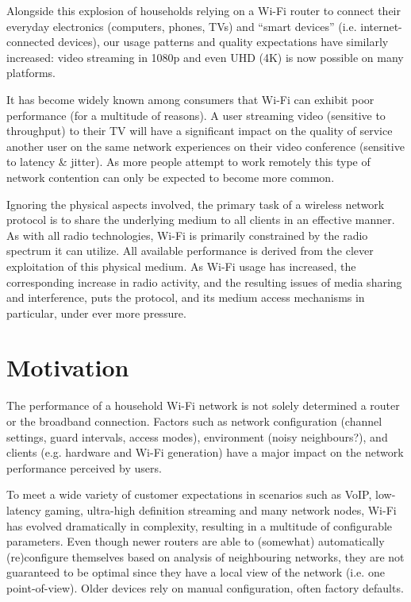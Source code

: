 Alongside this explosion of households relying on a Wi-Fi router to connect
their everyday electronics (computers, phones, TVs) and ``smart devices''
(i.e. internet-connected devices), our usage patterns and quality expectations
have similarly increased: video streaming in 1080p and even UHD (4K) is now
possible on many platforms.

It has become widely known among consumers that Wi-Fi can exhibit poor
performance (for a multitude of reasons). A user streaming video (sensitive to
throughput) to their TV will have a significant impact on the quality of
service another user on the same network experiences on their video conference
(sensitive to latency \& jitter). As more people attempt to work remotely this
type of network contention can only be expected to become more common.

Ignoring the physical aspects involved, the primary task of a wireless network
protocol is to share the underlying medium to all clients in an effective
manner. As with all radio technologies, Wi-Fi is primarily constrained by the
radio spectrum it can utilize. All available performance is derived from the
clever exploitation of this physical medium. As Wi-Fi usage has increased, the
corresponding increase in radio activity, and the resulting issues of media
sharing and interference, puts the protocol, and its medium access mechanisms
in particular, under ever more pressure.

\section{Motivation}


The performance of a household Wi-Fi network is not solely determined a router
or the broadband connection. Factors such as network configuration (channel
settings, guard intervals, access modes), environment (noisy neighbours?), and
clients (e.g. hardware and Wi-Fi generation) have a major impact on the
network performance perceived by users.

To meet a wide variety of customer expectations in scenarios such as VoIP,
low-latency gaming, ultra-high definition streaming and many network nodes,
Wi-Fi has evolved dramatically in complexity, resulting in a multitude of
configurable parameters. Even though newer routers are able to (somewhat)
automatically (re)configure themselves based on analysis of neighbouring
networks, they are not guaranteed to be optimal since they have a local view
of the network (i.e. one point-of-view). Older devices rely on manual
configuration, often factory defaults.

